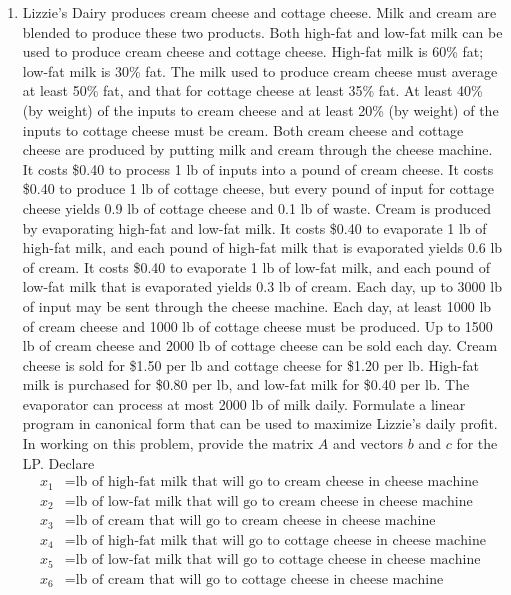 \documentclass{article}
\begin{document}
\begin{enumerate}
		\newpage
	\item Lizzie’s Dairy produces cream cheese and cottage cheese. Milk and cream are blended to produce these two products. Both high-fat and low-fat milk can be used to produce cream cheese and cottage cheese. High-fat milk is 60\% fat; low-fat milk is 30\% fat. The milk used to produce cream cheese must average at least 50\% fat, and that for cottage cheese at least 35\% fat. At least 40\% (by weight) of the inputs to cream cheese and at least 20\% (by weight) of the inputs to cottage cheese must be cream. Both cream cheese and cottage cheese are produced by putting milk and cream through the cheese machine. It costs \$0.40 to process 1 lb of inputs into a pound of cream cheese. It costs \$0.40 to produce 1 lb of cottage cheese, but every pound of input for cottage cheese yields 0.9 lb of cottage cheese and 0.1 lb of waste. Cream is produced by evaporating high-fat and low-fat milk. It costs \$0.40 to evaporate 1 lb of high-fat milk, and each pound of high-fat milk that is evaporated yields 0.6 lb of cream. It costs \$0.40 to evaporate 1 lb of low-fat milk, and each pound of low-fat milk that is evaporated yields 0.3 lb of cream. Each day, up to 3000 lb of input may be sent through the cheese machine. Each day, at least 1000 lb of cream cheese and 1000 lb of cottage cheese must be produced. Up to 1500 lb of cream cheese and 2000 lb of cottage cheese can be sold each day. Cream cheese is sold for \$1.50 per lb	and cottage cheese for \$1.20 per lb. High-fat milk is purchased for \$0.80 per lb, and low-fat milk for \$0.40 per lb. The evaporator can process at most 2000 lb of milk daily. Formulate a linear program in canonical form that can be used to maximize Lizzie’s daily profit.
		In working on this problem, provide the matrix $A$ and vectors $b$ and $c$ for the LP. Declare
		\begin{align*}
			x_1 &= \text{lb of high-fat milk that will go to cream cheese in cheese machine} \\
			x_2 &= \text{lb of low-fat milk that will go to cream cheese in cheese machine} \\
			x_3 &= \text{lb of cream that will go to cream cheese in cheese machine} \\
			x_4 &= \text{lb of high-fat milk that will go to cottage cheese in cheese machine} \\
			x_5 &= \text{lb of low-fat milk that will go to cottage cheese in cheese machine} \\
			x_6 &= \text{lb of cream that will go to cottage cheese in cheese machine} \\

\end{align*}
\end{enumerate}
\end{document}
